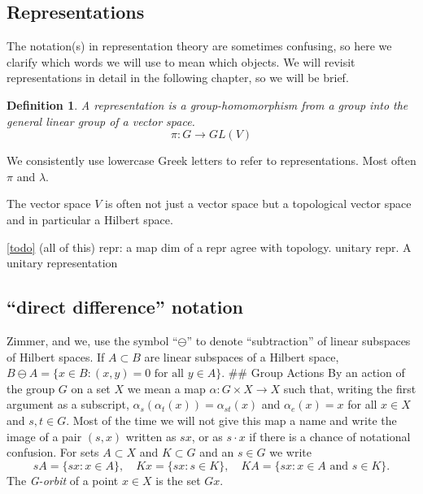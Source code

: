 \documentclass[
]{article}
\newtheorem{defn}{Definition}
\begin{document}
\hypertarget{representations}{%
\subsection{Representations}\label{representations}}

The notation(s) in representation theory are sometimes confusing, so
here we clarify which words we will use to mean which objects. We will
revisit representations in detail in the following chapter, so we will
be brief.

\begin{defn}
A representation is a group-homomorphism from a group into the general linear group of a vector space.
$$
\pi: G \rightarrow GL(V)
$$
\end{defn}

We consistently use lowercase Greek letters to refer to representations.
Most often \(\pi\) and \(\lambda\).

The vector space \(V\) is often not just a vector space but a
topological vector space and in particular a Hilbert space.

\href{ergodicity}{{[}todo{]}} (all of this) repr: a map dim of a repr
agree with topology. unitary repr. A unitary representation

\hypertarget{direct-difference-notation}{%
\subsection{``direct difference''
notation}\label{direct-difference-notation}}

Zimmer, and we, use the symbol ``\(\ominus\)'' to denote ``subtraction''
of linear subspaces of Hilbert spaces. If \(A \subset B\) are linear
subspaces of a Hilbert space,
\(B \ominus A = \{x \in B: (x,y) = 0 \text{ for all }y \in A\}\). \#\#
Group Actions By an action of the group \(G\) on a set \(X\) we mean a
map \(\alpha: G \times X \rightarrow X\) such that, writing the first
argument as a subscript, \(\alpha_s(\alpha_t(x)) = \alpha_{st}(x)\) and
\(\alpha_e(x) = x\) for all \(x \in X\) and \(s, t \in G\). Most of the
time we will not give this map a name and write the image of a pair
\((s, x)\) written as \(sx\), or as \(s \cdot x\) if there is a chance
of notational confusion. For sets \(A \subset X\) and \(K \subset G\)
and an \(s \in G\) we write \[
s A = \{sx : x \in A\},
\quad
K x = \{sx : s \in K \},
\quad
K A = \{sx : x \in A \text{ and } s \in K \}.
\] The \emph{G-orbit} of a point \(x \in X\) is the set \(Gx\).
\end{document}
